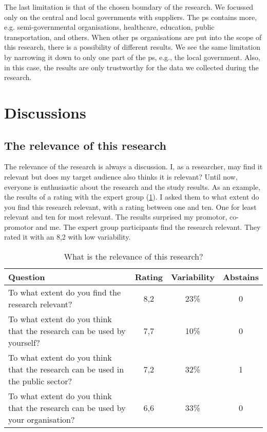 The last limitation is that of the chosen boundary of the research. We focussed only on the central and local governments with suppliers. The \gls{ps} contains more, e.g. semi-governmental organisations, healthcare, education, public transportation, and others. When other \gls{ps} organisations are put into the scope of this research, there is a possibility of different results. We see the same limitation by narrowing it down to only one part of the \gls{ps}, e.g., the local government. Also, in this case, the results are only trustworthy for the data we collected during the research.

\section{Discussions}
\label{sec:discussions}

\subsection{The relevance of this research}
\label{sub:relevanceofresearch}
The relevance of the research is always a discussion. I, as a researcher, may find it relevant but does my target audience also thinks it is relevant? Until now, everyone is enthusiastic about the research and the study results. As an example, the results of a rating with the expert group (\cref{tab:relevance}). I asked them to what extent do you find this research relevant, with a rating between one and ten. One for least relevant and ten for most relevant. The results surprised my promotor, co-promotor and me. The expert group participants find the research relevant. They rated it with an 8,2 with low variability.
\begin{table}[H]
	\centering
	\begin{tabular}{p{}ccc}
		\toprule
		\textbf{Question} & \textbf{Rating} & \textbf{Variability} & \textbf{Abstains} \\
		\midrule
		To what extent do you find the research relevant? & 8,2 & 23\% & 0 \\%
		To what extent do you think that the research can be used by yourself? & 7,7 & 10\% & 0 \\%
		To what extent do you think that the research can be used in the public sector? & 7,2 & 32\% & 1 \\%
		To what extent do you think that the research can be used by your organisation? & 6,6 & 33\% & 0 \\%
		\bottomrule
	\end{tabular}%
	\caption[What is the relevance of this research?]{What is the relevance of this research?}
	\label{tab:relevance}%
\end{table}%

